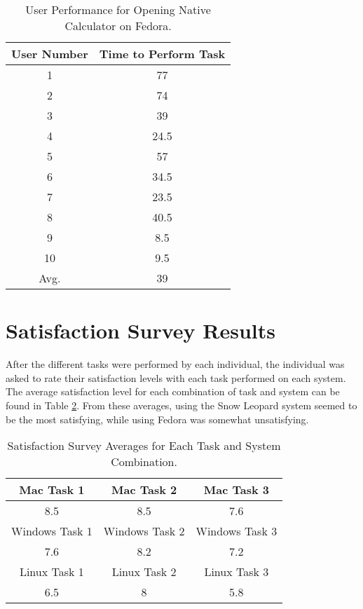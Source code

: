 \documentclass[11pt,letterpaper]{report}
\begin{document}
\begin{table}
    \centering
    \begin{tabular}{| c | c |}
        \hline
        User Number & Time to Perform Task \\ \hline
        1 & 77 \\  \hline
        2 & 74 \\  \hline
        3 & 39 \\ \hline
        4 & 24.5 \\  \hline
        5 & 57 \\    \hline
        6 & 34.5 \\  \hline
        7 & 23.5 \\ \hline
        8 & 40.5 \\  \hline
        9 & 8.5 \\ \hline
        10 & 9.5 \\ \hline
        Avg. & 39 \\
        \hline
    \end{tabular}
    \caption{User Performance for Opening Native Calculator on Fedora.}
    \label{calcL}    
\end{table}


\section{Satisfaction Survey Results}

After the different tasks were performed by each individual, the individual was asked to rate their satisfaction levels with each task performed on each system. The average satisfaction level for each combination of task and system can be found in Table \ref{Satisfaction}. From these averages, using the Snow Leopard system seemed to be the most satisfying, while using Fedora was somewhat unsatisfying.

\begin{table}
    \centering
    \begin{tabular}{| c | c | c |}
        \hline
        Mac Task 1 &  Mac Task 2 & Mac Task 3 \\ \hline
        8.5 & 8.5 & 7.6 \\
        \hline
        \hline
        Windows Task 1 & Windows Task 2 & Windows Task 3 \\ \hline
        7.6 & 8.2 & 7.2 \\
        \hline
        \hline
        Linux Task 1 & Linux Task 2 & Linux Task 3 \\ \hline 
        6.5 & 8 & 5.8 \\
        \hline
    \end{tabular}
    \caption{Satisfaction Survey Averages for Each Task and System Combination.}
    \label{Satisfaction}    
\end{table}
\end{document}
